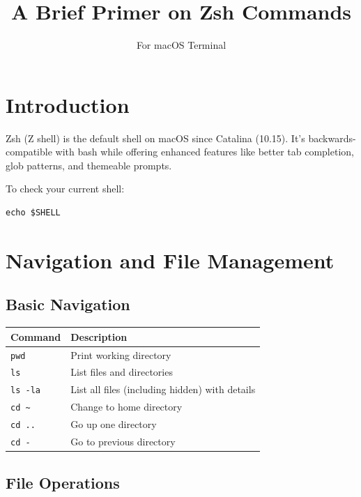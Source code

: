 \documentclass[11pt]{article}
\title{A Brief Primer on Zsh Commands}
\author{For macOS Terminal}
\date{}
\begin{document}
\maketitle

\tableofcontents
\newpage

\section{Introduction}

Zsh (Z shell) is the default shell on macOS since Catalina (10.15). It's backwards-compatible with bash while offering enhanced features like better tab completion, glob patterns, and themeable prompts.

To check your current shell:
\begin{lstlisting}
echo $SHELL
\end{lstlisting}

\section{Navigation and File Management}

\subsection{Basic Navigation}

\begin{center}
\begin{tabular}{ll}
\toprule
Command & Description \\
\midrule
\texttt{pwd} & Print working directory \\
\texttt{ls} & List files and directories \\
\texttt{ls -la} & List all files (including hidden) with details \\
\texttt{cd \textasciitilde} & Change to home directory \\
\texttt{cd ..} & Go up one directory \\
\texttt{cd -} & Go to previous directory \\
\bottomrule
\end{tabular}
\end{center}

\subsection{File Operations}
\end{document}
